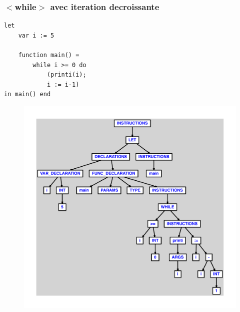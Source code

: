 \documentclass{article}
\begin{document}
\subsubsection{$ < $while$ > $ avec iteration decroissante}
\begin{lstlisting}
let
	var i := 5

	function main() =
		while i >= 0 do
			(printi(i);
			i := i-1)
in main() end
\end{lstlisting}
\newpage
\begin{figure}[H]
\centering
\includegraphics[max width=\textwidth]{ast/ast_330.pdf}
\end{figure}
\newpage
\end{document}
